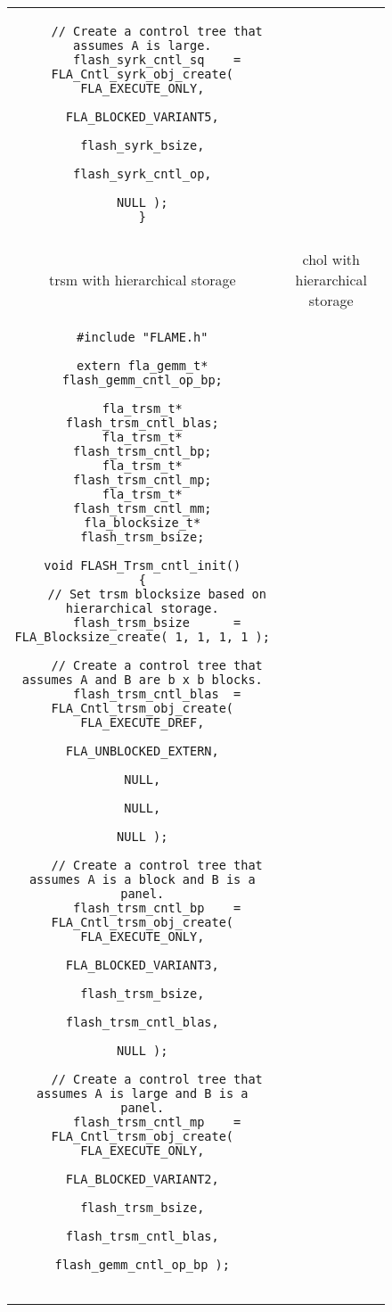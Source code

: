 \begin{figure}[tbp]
\begin{center}
\begin{tabular}{|c|c|}
\begin{minipage}[t]{3in}
{\begin{verbatim}
    // Create a control tree that assumes A is large.
    flash_syrk_cntl_sq    = FLA_Cntl_syrk_obj_create( FLA_EXECUTE_ONLY,
                                                      FLA_BLOCKED_VARIANT5,
                                                      flash_syrk_bsize,
                                                      flash_syrk_cntl_op,
                                                      NULL );
}
\end{verbatim}
}
\end{minipage}
\\
 & \\ \hline
{\sc trsm} with hierarchical storage & {\sc chol} with hierarchical storage \\ \hline
\begin{minipage}[t]{3in}
{\tiny
\begin{verbatim}
#include "FLAME.h"

extern fla_gemm_t* flash_gemm_cntl_op_bp;

fla_trsm_t*        flash_trsm_cntl_blas;
fla_trsm_t*        flash_trsm_cntl_bp;
fla_trsm_t*        flash_trsm_cntl_mp;
fla_trsm_t*        flash_trsm_cntl_mm;
fla_blocksize_t*   flash_trsm_bsize;

void FLASH_Trsm_cntl_init()
{
    // Set trsm blocksize based on hierarchical storage.
    flash_trsm_bsize      = FLA_Blocksize_create( 1, 1, 1, 1 );

    // Create a control tree that assumes A and B are b x b blocks.
    flash_trsm_cntl_blas  = FLA_Cntl_trsm_obj_create( FLA_EXECUTE_DREF,
                                                      FLA_UNBLOCKED_EXTERN,
                                                      NULL,
                                                      NULL,
                                                      NULL );

    // Create a control tree that assumes A is a block and B is a panel.
    flash_trsm_cntl_bp    = FLA_Cntl_trsm_obj_create( FLA_EXECUTE_ONLY,
                                                      FLA_BLOCKED_VARIANT3,
                                                      flash_trsm_bsize,
                                                      flash_trsm_cntl_blas,
                                                      NULL );

    // Create a control tree that assumes A is large and B is a panel.
    flash_trsm_cntl_mp    = FLA_Cntl_trsm_obj_create( FLA_EXECUTE_ONLY,
                                                      FLA_BLOCKED_VARIANT2,
                                                      flash_trsm_bsize,
                                                      flash_trsm_cntl_blas,
                                                      flash_gemm_cntl_op_bp );


\end{verbatim}}
\end{minipage}
\end{tabular}
\end{center}
\end{figure}
